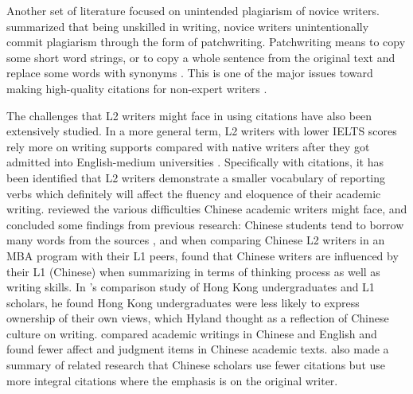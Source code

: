 Another set of literature focused on unintended plagiarism of novice writers. \citet{wette_source_2017} summarized that being unskilled in writing, novice writers unintentionally commit plagiarism through the form of patchwriting. Patchwriting means to copy some short word strings, or to copy a whole sentence from the original text and replace some words with synonyms \citep{li_two_2012, pecorari_good_2003}. This is one of the major issues toward making high-quality citations for non-expert writers \citep{wette_source_2017}.

The challenges that L2 writers might face in using citations have also been extensively studied. In a more general term, L2 writers with lower IELTS scores rely more on writing supports compared with native writers after they got admitted into English-medium universities \citep{ridley_tracking_2006}. Specifically with citations, it has been identified that L2 writers demonstrate a smaller vocabulary of reporting verbs \citep{schmitt_writing_2007, thompson_evaluation_1991} which definitely will affect the fluency and eloquence of their academic writing. \citet{shi_chinese_2018} reviewed the various difficulties Chinese academic writers might face, and concluded some findings from previous research: Chinese students tend to borrow many words from the sources \citep{shi_textual_2004}, and when comparing Chinese L2 writers in an MBA program with their L1 peers, \citet{yang_exploring_2003} found that Chinese writers are influenced by their L1 (Chinese) when summarizing in terms of thinking process as well as writing skills. In \citeauthor{hyland_authority_2002}’s \citeyearpar{hyland_authority_2002} comparison study of Hong Kong undergraduates and L1 scholars, he found Hong Kong undergraduates were less likely to express ownership of their own views, which Hyland thought as a reflection of Chinese culture on writing. \citet{liu_attitude_2009} compared academic writings in Chinese and English and found fewer affect and judgment items in Chinese academic texts. \citet{shi_chinese_2018} also made a summary of related research that Chinese scholars use fewer citations but use more integral citations where the emphasis is on the original writer.